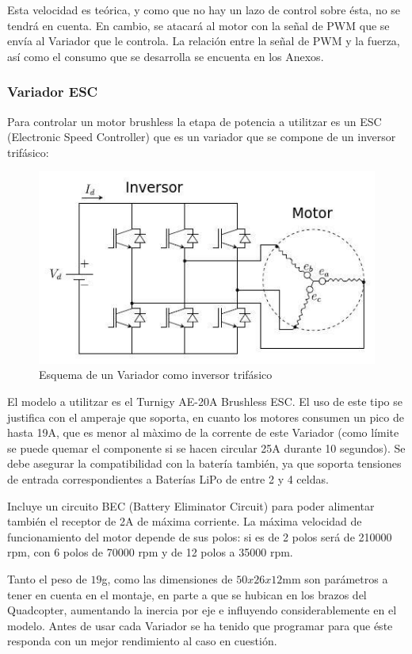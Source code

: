 \documentclass[twoside,11pt]{book}
\begin{document}
Esta velocidad es teórica, y como que no hay un lazo de control sobre ésta, no se tendrá en cuenta. En cambio, se atacará al motor con la señal de PWM que se envía al Variador que le controla. La relación entre la señal de PWM y la fuerza, así como el consumo que se desarrolla se encuenta en los Anexos. 

\subsubsection*{Variador ESC}


Para controlar un motor brushless la etapa de potencia a utilitzar es un ESC (Electronic Speed Controller) que es un  variador que se compone de un inversor trifásico:
\begin{figure}[h!]
\begin{center}
\includegraphics[scale=0.5,bb=0 0 420 200]{images/ESC.png}
\caption{Esquema de un Variador como inversor trifásico}
\end{center}
\end{figure}
El modelo a utilitzar es el Turnigy AE-20A Brushless ESC. El uso de este tipo se justifica con el amperaje que soporta, en cuanto los motores consumen un pico de hasta 19A, que es menor al màximo de la corrente de este Variador (como límite se puede quemar el componente si se hacen circular 25A durante 10 segundos). 
Se debe asegurar la compatibilidad con la batería también, ya que soporta tensiones de entrada correspondientes a Baterías LiPo de entre 2 y 4 celdas. 

Incluye un circuito BEC (Battery Eliminator Circuit) para poder alimentar también el receptor de 2A de máxima corriente. 
La máxima velocidad de funcionamiento del motor depende de sus polos: si es de 2 polos será de 210000 rpm, con 6 polos de 70000 rpm y de 12 polos a 35000 rpm.


Tanto el peso de $19$g,  como las dimensiones de $50x26x12$mm son parámetros a tener en cuenta en el montaje, en parte a que se hubican en los brazos del Quadcopter, aumentando la inercia por eje e influyendo considerablemente en el modelo. Antes de usar cada Variador se ha tenido que programar para que éste responda con un mejor rendimiento al caso en cuestión.
\end{document}
